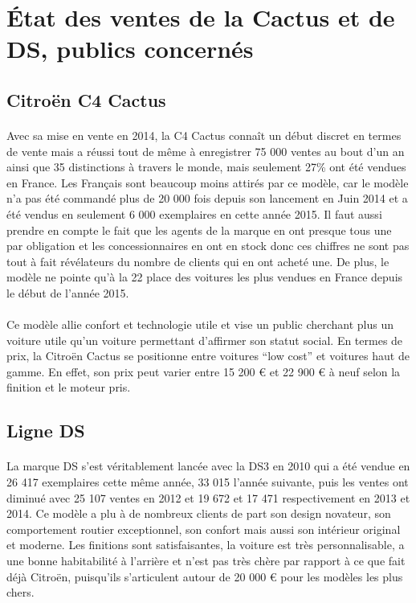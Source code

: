 \documentclass[12pt]{article}\usepackage[]{graphicx}\usepackage[]{color}
\begin{document}
\section{État des ventes de la Cactus et de DS, publics concernés}

\subsection{Citroën C4 Cactus}

\paragraph{} Avec sa mise en vente en 2014, la C4 Cactus connaît un début
discret en termes de vente mais a réussi tout de même à enregistrer 75 000
ventes au bout d'un an ainsi que 35 distinctions à travers le
monde\cite{communique}, mais seulement 27\% ont été vendues en France. Les
Français sont beaucoup moins attirés par ce modèle, car le modèle n'a pas été
commandé plus de 20 000 fois depuis son lancement en Juin 2014 et a été vendus
en seulement 6 000 exemplaires en cette année 2015. Il faut aussi prendre en
compte le fait que les agents de la marque en ont presque tous une par
obligation et les concessionnaires en ont en stock donc ces chiffres ne sont
pas tout à fait révélateurs du nombre de clients qui en ont acheté une. De
plus, le modèle ne pointe qu'à la 22\ieme{} place des voitures les plus vendues
en France depuis le début de l'année 2015.

\paragraph{} Ce modèle allie confort et technologie utile et vise un public
cherchant plus un voiture utile qu'un voiture permettant d'affirmer son statut
social. En termes de prix, la Citroën Cactus se positionne entre voitures ``low
cost'' et voitures haut de gamme. En effet, son prix peut varier entre 15 200 €
et 22 900 € à neuf selon la finition et le moteur pris\cite{banquette}.

\subsection{Ligne DS}

\paragraph{} La marque DS s'est véritablement lancée avec la DS3 en 2010 qui a
été vendue en 26 417 exemplaires cette même année, 33 015 l'année suivante,
puis les ventes ont diminué avec 25 107 ventes en 2012 et 19 672 et 17 471
respectivement en 2013 et 2014. Ce modèle a plu à de nombreux clients de part
son design novateur\cite{avis}, son comportement routier exceptionnel, son
confort mais aussi son intérieur original et moderne. Les finitions sont
satisfaisantes, la voiture est très personnalisable, a une bonne habitabilité à
l'arrière et n'est pas très chère par rapport à ce que fait déjà Citroën,
puisqu'ils s'articulent autour de 20 000 € pour les modèles les plus chers.
\end{document}
